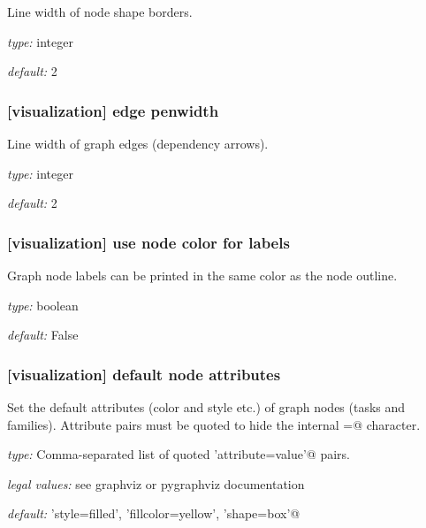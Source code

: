 Line width of node shape borders.

\begin{myitemize}
    \item {\em type:} integer
    \item {\em default:} 2
\end{myitemize}

\subsubsection[edge penwidth]{[visualization] \textrightarrow edge penwidth}

Line width of graph edges (dependency arrows).

\begin{myitemize}
    \item {\em type:} integer
    \item {\em default:} 2
\end{myitemize}

\subsubsection[use node color for labels]{[visualization] \textrightarrow use node color for labels}

Graph node labels can be printed in the same color as the node outline.

\begin{myitemize}
    \item {\em type:} boolean
    \item {\em default:} False
\end{myitemize}


\subsubsection[default node attributes]{[visualization] \textrightarrow default node attributes}

Set the default attributes (color and style etc.) of graph nodes (tasks and families).
Attribute pairs must be quoted to hide the internal \lstinline@=@ character.

\begin{myitemize}
    \item {\em type:} Comma-separated list of quoted \lstinline@'attribute=value'@ pairs.
    \item {\em legal values:} see graphviz or pygraphviz documentation
    \item {\em default:} \lstinline@'style=filled', 'fillcolor=yellow', 'shape=box'@
\end{myitemize}

